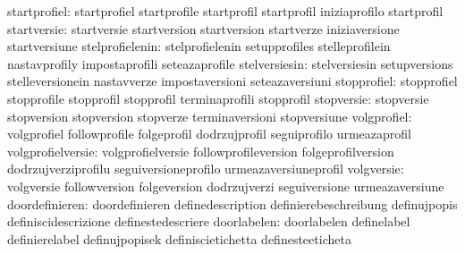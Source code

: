                     startprofiel: startprofiel                     startprofile
                                  startprofil                      startprofil
                                  iniziaprofilo                    startprofil
                     startversie: startversie                      startversion
                                  startversion                     startverze
                                  iniziaversione                   startversiune
                 stelprofielenin: stelprofielenin                  setupprofiles
                                  stelleprofilein                  nastavprofily
                                  impostaprofili                   seteazaprofile
                   stelversiesin: stelversiesin                    setupversions
                                  stelleversionein                 nastavverze
                                  impostaversioni                  seteazaversiuni
                     stopprofiel: stopprofiel                      stopprofile
                                  stopprofil                       stopprofil
                                  terminaprofili                   stopprofil
                      stopversie: stopversie                       stopversion
                                  stopversion                      stopverze
                                  terminaversioni                  stopversiune
                     volgprofiel: volgprofiel                      followprofile
                                  folgeprofil                      dodrzujprofil
                                  seguiprofilo                     urmeazaprofil
               volgprofielversie: volgprofielversie                followprofileversion
                                  folgeprofilversion               dodrzujverziprofilu
                                  seguiversioneprofilo             urmeazaversiuneprofil
                      volgversie: volgversie                       followversion
                                  folgeversion                     dodrzujverzi
                                  seguiversione                    urmeazaversiune
                  doordefinieren: doordefinieren                   definedescription
                                  definierebeschreibung            definujpopis
                                  definiscidescrizione             definestedescriere
                     doorlabelen: doorlabelen                      definelabel
                                  definierelabel                   definujpopisek
                                  definiscietichetta               definesteeticheta
